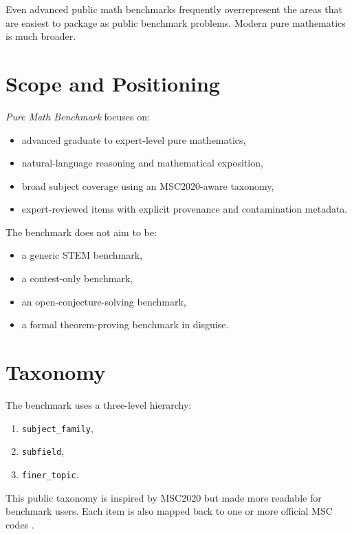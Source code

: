 \documentclass[11pt]{article}
\begin{document}
Even advanced public math benchmarks frequently overrepresent the areas that are easiest to package as public benchmark problems. Modern pure mathematics is much broader.

\section{Scope and Positioning}

\emph{Pure Math Benchmark} focuses on:
\begin{itemize}[leftmargin=*]
  \item advanced graduate to expert-level pure mathematics,
  \item natural-language reasoning and mathematical exposition,
  \item broad subject coverage using an MSC2020-aware taxonomy,
  \item expert-reviewed items with explicit provenance and contamination metadata.
\end{itemize}

The benchmark does not aim to be:
\begin{itemize}[leftmargin=*]
  \item a generic STEM benchmark,
  \item a contest-only benchmark,
  \item an open-conjecture-solving benchmark,
  \item a formal theorem-proving benchmark in disguise.
\end{itemize}

\section{Taxonomy}

The benchmark uses a three-level hierarchy:
\begin{enumerate}[leftmargin=*]
  \item \texttt{subject\_family},
  \item \texttt{subfield},
  \item \texttt{finer\_topic}.
\end{enumerate}

This public taxonomy is inspired by MSC2020 but made more readable for benchmark users. Each item is also mapped back to one or more official MSC codes \cite{msc2020}.
\end{document}
